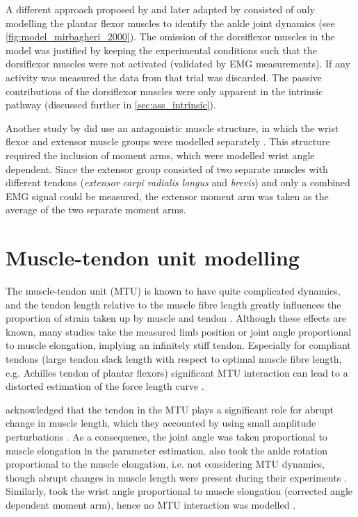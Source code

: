 A different approach proposed by \citeauthor{kearney_identification_1997} and later adapted by \citeauthor{mirbagheri_intrinsic_2000} consisted of only modelling the plantar flexor muscles to identify the ankle joint dynamics \cite{kearney_identification_1997, mirbagheri_intrinsic_2000} (see \autoref{fig:model_mirbagheri_2000}). The omission of the dorsiflexor muscles in the model was justified by keeping the experimental conditions such that the dorsiflexor muscles were not activated (validated by EMG measurements). If any activity was measured the data from that trial was discarded. The passive contributions of the dorsiflexor muscles were only apparent in the intrinsic pathway (discussed further in \autoref{sec:ass_intrinsic}). 

Another study by \citeauthor{de_gooijer-van_de_groep_estimation_2016} did use an antagonistic muscle structure, in which the wrist flexor and extensor muscle groups were modelled separately \cite{de_gooijer-van_de_groep_estimation_2016}. This structure required the inclusion of moment arms, which were modelled wrist angle dependent. Since the extensor group consisted of two separate muscles with different tendons (\textit{extensor carpi radialis longus} and \textit{brevis}) and only a combined EMG signal could be measured, the extensor moment arm was taken as the average of the two separate moment arms. 



\section{Muscle-tendon unit modelling}
The muscle-tendon unit (MTU) is known to have quite complicated dynamics, and the tendon length relative to the muscle fibre length greatly influences the proportion of strain taken up by muscle and tendon \cite{zajac_muscle_1989}. Although these effects are known, many studies take the measured limb position or joint angle proportional to muscle elongation, implying an infinitely stiff tendon. Especially for compliant tendons (large tendon slack length with respect to  optimal muscle fibre length, e.g. Achilles tendon of plantar flexors) significant MTU interaction can lead to a distorted estimation of the force length curve \cite{zajac_muscle_1989}. 

\citeauthor{zhang_simultaneous_1997} acknowledged that the tendon in the MTU plays a significant role for abrupt change in muscle length, which they accounted by using small amplitude perturbations \cite{zhang_simultaneous_1997}. As a consequence, the joint angle was taken proportional to muscle elongation in the parameter estimation. \citeauthor{mirbagheri_intrinsic_2000} also took the ankle rotation proportional to the muscle elongation, i.e. not considering MTU dynamics, though abrupt changes in muscle length were present during their experiments \cite{mirbagheri_intrinsic_2000}. Similarly, \citeauthor{de_gooijer-van_de_groep_estimation_2016} took the wrist angle proportional to muscle elongation (corrected angle dependent moment arm), hence no MTU interaction was modelled \cite{de_gooijer-van_de_groep_estimation_2016}. 

